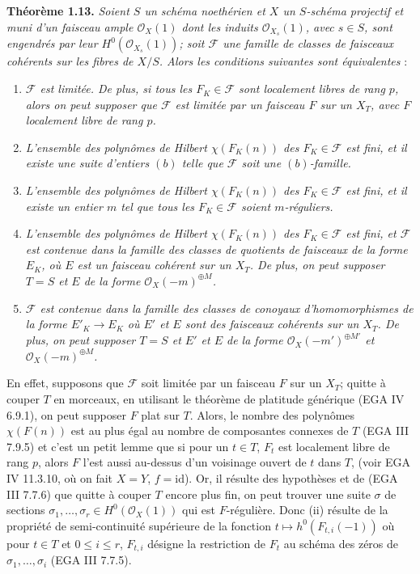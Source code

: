 \textbf{Théorème 1.13.}
\emph{Soient \(S\) un schéma noethérien et \(X\) un \(S\)-schéma projectif et muni d'un faisceau ample \(\mathcal O_X(1)\) dont les induits \(\mathcal O_{X_s}(1)\), avec \(s\in S\), sont engendrés par leur \(H^0(\mathcal O_{X_s}(1))\); soit \(\mathcal F\) une famille de classes de faisceaux cohérents sur les fibres de \(X/S\). Alors les conditions suivantes sont équivalentes} :
\begin{enumerate}[label=(\roman*)]
\item \emph{\(\mathcal F\) est limitée. De plus, si tous les \(F_K\in\mathcal F\) sont localement libres de rang \(p\), alors on peut supposer que \(\mathcal F\) est limitée par un faisceau \(F\) sur un \(X_T\), avec \(F\) localement libre de rang \(p\).}
\item \emph{L'ensemble des polynômes de Hilbert \(\chi(F_K(n))\) des \(F_K\in\mathcal F\) est fini, et il existe une suite d'entiers \((b)\) telle que \(\mathcal F\) soit une \((b)\)-famille.}
\item \emph{L'ensemble des polynômes de Hilbert \(\chi(F_K(n))\) des \(F_K\in\mathcal F\) est fini, et il existe un entier \(m\) tel que tous les \(F_K\in\mathcal F\) soient \(m\)-réguliers.}
\item \emph{L'ensemble des polynômes de Hilbert \(\chi(F_K(n))\) des \(F_K\in\mathcal F\) est fini, et \(\mathcal F\) est contenue dans la famille des classes de quotients de faisceaux de la forme \(E_K\), où \(E\) est un faisceau cohérent sur un \(X_T\). De plus, on peut supposer \(T=S\) et \(E\) de la forme \(\mathcal O_X(-m)^{\oplus M}\).}
\item \emph{\(\mathcal F\) est contenue dans la famille des classes de conoyaux d'homomorphismes de la forme \(E'_K\to E_K\) où \(E'\) et \(E\) sont des faisceaux cohérents sur un \(X_T\). De plus, on peut supposer \(T=S\) et \(E'\) et \(E\) de la forme \(\mathcal O_X(-m')^{\oplus M'}\) et \(\mathcal O_X(-m)^{\oplus M}\).}
\end{enumerate}
En effet, supposons que \(\mathcal F\) soit limitée par un faisceau \(F\) sur un \(X_T\); quitte à couper \(T\) en morceaux, en utilisant le théorème de platitude générique (EGA IV 6.9.1), on peut supposer \(F\) plat sur \(T\). Alors, le
nombre des polynômes \(\chi(F(n))\) est au plus égal au nombre de composantes connexes de \(T\) (EGA III 7.9.5) et c'est un petit lemme que si pour un \(t\in T\), \(F_t\) est localement libre de rang \(p\), alors \(F\) l'est aussi au-dessus d'un voisinage ouvert de \(t\) dans \(T\), (voir EGA IV 11.3.10, où on fait \(X=Y\), \(f=\mathrm{id}\)). Or, il résulte des hypothèses et de (EGA III 7.7.6) que quitte à couper \(T\) encore plus fin, on peut trouver une suite \(\sigma\) de sections \(\sigma_1,\ldots,\sigma_r\in H^0(\mathcal O_X(1))\) qui est \(F\)-régulière. Donc (ii) résulte de la propriété de semi-continuité supérieure de la fonction \(t\longmapsto h^0(F_{t,i}(-1))\) où pour \(t\in T\) et \(0\le i\le r\), \(F_{t,i}\) désigne la restriction de \(F_t\) au schéma des zéros de \(\sigma_1,\ldots,\sigma_i\) (EGA III 7.7.5).

